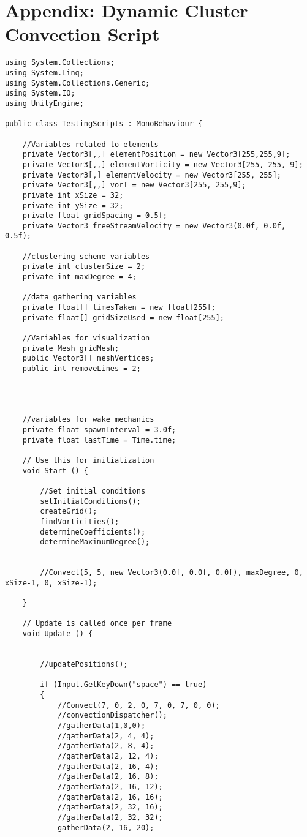 \section{Appendix: Dynamic Cluster Convection Script}

\begin{mdframed}[linecolor=black, topline=true, bottomline=true,
  leftline=false, rightline=false]
\begin{verbatim}
using System.Collections;
using System.Linq;
using System.Collections.Generic;
using System.IO;
using UnityEngine;

public class TestingScripts : MonoBehaviour {

    //Variables related to elements
    private Vector3[,,] elementPosition = new Vector3[255,255,9];
    private Vector3[,,] elementVorticity = new Vector3[255, 255, 9];
    private Vector3[,] elementVelocity = new Vector3[255, 255];
    private Vector3[,,] vorT = new Vector3[255, 255,9];
    private int xSize = 32;
    private int ySize = 32;
    private float gridSpacing = 0.5f;
    private Vector3 freeStreamVelocity = new Vector3(0.0f, 0.0f, 0.5f);

    //clustering scheme variables
    private int clusterSize = 2;
    private int maxDegree = 4;

    //data gathering variables
    private float[] timesTaken = new float[255];
    private float[] gridSizeUsed = new float[255];

    //Variables for visualization
    private Mesh gridMesh;
    public Vector3[] meshVertices;
    public int removeLines = 2;




    //variables for wake mechanics
    private float spawnInterval = 3.0f;
    private float lastTime = Time.time;

    // Use this for initialization
    void Start () {

        //Set initial conditions
        setInitialConditions();
        createGrid();
        findVorticities();
        determineCoefficients();
        determineMaximumDegree();


        //Convect(5, 5, new Vector3(0.0f, 0.0f, 0.0f), maxDegree, 0, xSize-1, 0, xSize-1);

    }
	
	// Update is called once per frame
	void Update () {

        
        //updatePositions();

        if (Input.GetKeyDown("space") == true)
        {
            //Convect(7, 0, 2, 0, 7, 0, 7, 0, 0);
            //convectionDispatcher();
            //gatherData(1,0,0);
            //gatherData(2, 4, 4);
            //gatherData(2, 8, 4);
            //gatherData(2, 12, 4);
            //gatherData(2, 16, 4);
            //gatherData(2, 16, 8);
            //gatherData(2, 16, 12);
            //gatherData(2, 16, 16);
            //gatherData(2, 32, 16);
            //gatherData(2, 32, 32);
            gatherData(2, 16, 20);



\end{verbatim}
\end{mdframed}

